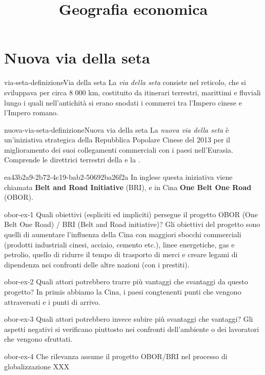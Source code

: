 \documentclass[preview]{standalone}
\begin{document}
\title{Geografia economica}
\genpage

\section{Nuova via della seta}

\begin{snippetdefinition}{via-seta-definizione}{Via della seta}
    La \textit{via della seta} consiste nel reticolo, che si sviluppava per circa 8 000 km,
    costituito da itinerari terrestri, marittimi e fluviali lungo i quali nell'antichità si
    erano snodati i commerci tra l'Impero cinese e l'Impero romano.
\end{snippetdefinition}

\begin{snippetdefinition}{nuova-via-seta-definizione}{Nuova via della seta}
    La \textit{nuova via della seta} è un'iniziativa strategica della Repubblica
    Popolare Cinese del 2013 per il miglioramento dei suoi collegamenti commerciali con
    i paesi nell'Eurasia. Comprende le direttrici terrestri della 
    e la .
\end{snippetdefinition}

\begin{snippet}{ea43b2a9-2b72-4c19-bab2-50692ba26f2a}
    In inglese questa iniziativa viene chiamata \textbf{Belt and Road Initiative} (BRI),
e in Cina \textbf{One Belt One Road} (OBOR).
\end{snippet}

\begin{snippetexercise}{obor-ex-1}
    {Quali obiettivi (espliciti ed impliciti) persegue il progetto OBOR (One Belt One Road) / BRI (Belt and Road initiative)?}
    Gli obiettivi del progetto sono quelli di aumentare l'influenza della Cina
    con maggiori sbocchi commerciali (prodotti industriali cinesi, acciaio, cemento etc.),
    linee energetiche, gas e petrolio, quello di ridurre il tempo di trasporto di merci
    e creare legami di dipendenza nei confronti delle altre nazioni (con i prestiti).
\end{snippetexercise}

\begin{snippetexercise}{obor-ex-2}
    {Quali attori potrebbero trarre più vantaggi che svantaggi da questo progetto?}
    In primis abbiamo la Cina, i paesi congtenenti punti che vengono attraversati
    e i punti di arrivo.
\end{snippetexercise}

\begin{snippetexercise}{obor-ex-3}
    {Quali attori potrebbero invece subire più svantaggi che vantaggi?}
    Gli aspetti negativi si verificano piuttosto nei confronti dell'ambiente o
    dei lavoratori che vengono sfruttati.
\end{snippetexercise}

\begin{snippetexercise}{obor-ex-4}
    {Che rilevanza assume il progetto OBOR/BRI nel processo di globalizzazione}
    XXX
\end{snippetexercise}
\end{document}
